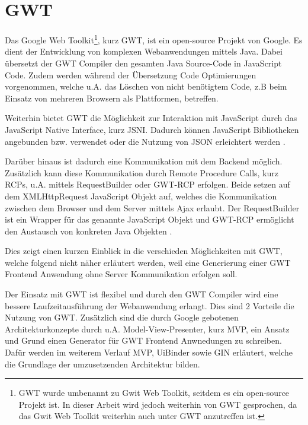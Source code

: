 \section{GWT}
\label{GWT}
Das Google Web Toolkit\footnote{GWT wurde umbenannt zu Gwit Web Toolkit, seitdem
es ein open-source Projekt ist. In dieser Arbeit wird jedoch
weiterhin von GWT gesprochen, da das Gwit Web Toolkit weiterhin auch unter GWT
anzutreffen ist.}, kurz GWT, ist ein open-source Projekt von Google.
Es dient der Entwicklung von komplexen Webanwendungen mittels Java.
Dabei übersetzt der GWT Compiler den gesamten Java Source-Code in JavaScript Code.
Zudem werden während der Übersetzung Code Optimierungen vorgenommen, welche u.A.
das Löschen von nicht benötigtem Code, z.B beim Einsatz von mehreren
Browsern als Plattformen, betreffen. 

Weiterhin bietet GWT die Möglichkeit zur Interaktion mit JavaScript durch
das JavaScript Native Interface, kurz JSNI.
Dadurch können JavaScript Bibliotheken angebunden bzw. verwendet oder die
Nutzung von JSON erleichtert werden \cite[S. 4-9]{bib:GWTinAction}\cite[S.
237-238]{bib:GWToReilly}.

Darüber hinaus ist dadurch eine Kommunikation mit dem Backend
möglich. Zusätzlich kann diese Kommunikation durch Remote Procedure Calls,
kurz RCPs, u.A. mittels RequestBuilder oder GWT-RCP erfolgen. Beide
setzen auf dem XMLHttpRequest JavaScript Objekt auf, welches die Kommunikation zwischen dem
Browser und dem Server mittels Ajax erlaubt. Der RequestBuilder ist ein
Wrapper für das genannte JavaScript Objekt und GWT-RCP ermöglicht den Austausch
von konkreten Java Objekten \cite[S. 16]{bib:GWTinAction}\cite[S.
222]{bib:GWToReilly}.

Dies zeigt einen kurzen Einblick in die verschieden Möglichkeiten mit
GWT, welche folgend nicht näher erläutert werden, weil eine Generierung einer
GWT Frontend Anwendung ohne Server Kommunikation erfolgen soll.

Der Einsatz mit GWT ist flexibel und durch den GWT Compiler wird 
eine bessere Laufzeitausführung der Webanwendung erlangt\cite{bib:GWTStarted}.
Dies sind 2 Vorteile die Nutzung von GWT. Zusätzlich sind die durch Google
gebotenen Architekturkonzepte durch u.A. Model-View-Presenter, kurz MVP, ein
Ansatz und Grund einen Generator für GWT Frontend Anwnedungen zu schreiben.
Dafür werden im weiterem Verlauf MVP, UiBinder sowie GIN erläutert, welche die
Grundlage der umzusetzenden Architektur bilden.
